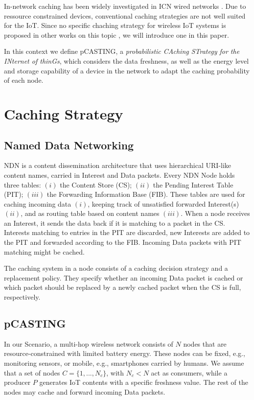 \documentclass[conference]{IEEEtran}
\begin{document}
In-network caching has been widely investigated in ICN wired networks \cite{b5}. Due to ressource constrained devices,
conventional caching strategies are not well suited for the IoT. Since no specific chaching strategy for wireless IoT systems
is proposed in other works on this topic \cite{b6, b7, b8}, we will introduce one in this paper.

In this context we define pCASTING, a \textit{probabilistic CAching STrategy for the INternet of thinGs}, which
considers the data freshness, as well as the energy level and storage capability of a device in the network to adapt
the caching probability of each node.

\section{Caching Strategy}

\subsection{Named Data Networking}

NDN is a content dissemination architecture that uses hierarchical URI-like content names, carried in
Interest and Data packets. Every NDN Node holds three tables: $(i)$ the Content Store (CS); $(ii)$ the Pending
Interest Table (PIT); $(iii)$ the Forwarding Information Base (FIB). These tables are used for caching incoming 
data $(i)$, keeping track of unsatisfied forwarded Interest(s) $(ii)$, and as routing table based on content names $(iii)$.
When a node receives an Interest, it sends the data back if it is matching to a packet in the CS. Interests matching to
entries in the PIT are discarded, new Interests are added to the PIT and forwarded according to the FIB. Incoming Data
packets with PIT matching might be cached.

The caching system in a node consists of a caching decision strategy and a replacement policy. They specify whether an incoming
Data packet is cached or which packet should be replaced by a newly cached packet when the CS is full, respectively.

\subsection{pCASTING}

In our Scenario, a multi-hop wireless network consists of $N$ nodes that are resource-constrained with limited battery energy.
These nodes can be fixed, e.g., monitoring sensors, or mobile, e.g., smartphones carried by humans. We assume that a set of nodes
$C = \{1, ..., N_c\}$, with $N_c < N$ act as consumers, while a producer $P$ generates IoT contents with a specific freshness value.
The rest of the nodes may cache and forward incoming Data packets.
\end{document}
